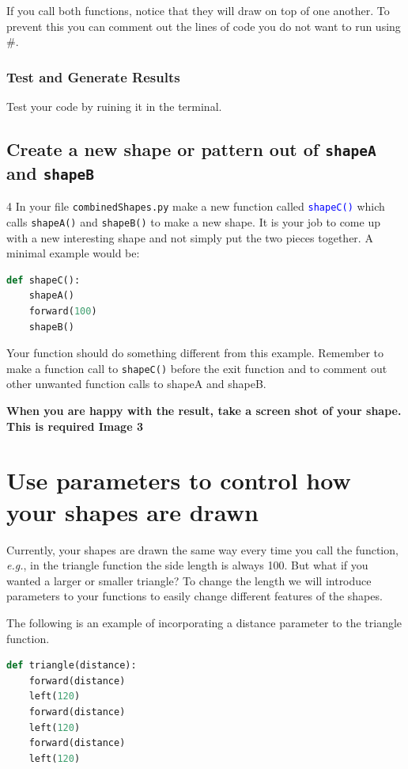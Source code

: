 \documentclass[12pt]{article}
\begin{document}
If you call both functions, notice that they will draw on top of one another.
To prevent this you can comment out the lines of code you do not want to run using \#.

\subsubsection{Test and Generate Results}
Test your code by ruining it in the terminal.


\subsection{Create a new shape or pattern out of \texttt{shapeA} and \texttt{shapeB}}4
In your file \texttt{combinedShapes.py} make a new function called \textcolor{blue}{\texttt{shapeC()}} which calls \texttt{shapeA()} and \texttt{shapeB()} to make a new shape.
It is your job to come up with a new interesting shape and not simply put the two pieces together.
A minimal example would be:
\begin{lstlisting}[language=Python]
def shapeC():
    shapeA()
    forward(100)
    shapeB()\end{lstlisting}

Your function should do something different from this example.
Remember to make a function call to \texttt{shapeC()} before the exit function and to comment out other unwanted function calls to shapeA and shapeB.

\textbf{When you are happy with the result, take a screen shot of your shape. This is required Image 3}

\section{Use parameters to control how your shapes are drawn}
Currently, your shapes are drawn the same way every time you call the function, \textit{e.g.}, in the triangle function the side length is always 100.
But what if you wanted a larger or smaller triangle?
To change the length we will introduce parameters to your functions to easily change different features of the shapes.

The following is an example of incorporating a distance parameter to the triangle function. 
\begin{lstlisting}[language=Python]
def triangle(distance):
    forward(distance)
    left(120)
    forward(distance)
    left(120)
    forward(distance)
    left(120)\end{lstlisting}
\end{document}
